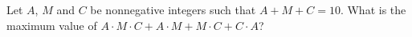 Let $A$, $M$ and $C$ be nonnegative integers such that $A+M+C=10$. What is the maximum value of $A\cdot M\cdot C+A\cdot M+M\cdot C+C\cdot A$?
